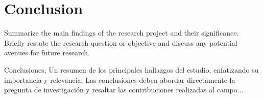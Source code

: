 \section{Conclusion}
Summarize the main findings of the research project and their significance. Briefly restate the research question or objective and discuss any potential avenues for future research. 

Conclusiones: Un resumen de los principales hallazgos del estudio, enfatizando su importancia y relevancia. Las conclusiones deben abordar directamente la pregunta de investigación y resaltar las contribuciones realizadas al campo... 





